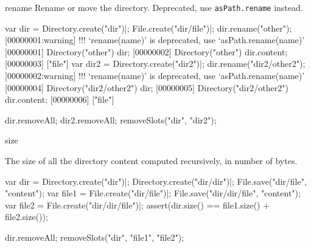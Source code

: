 \begin{urbiscriptapi}
\item[rename]
  Rename or move the directory. Deprecated, use
  \lstinline|asPath.rename| instead.
\begin{urbiscript}
var dir = Directory.create("dir")|;
File.create("dir/file")|;
dir.rename("other");
[00000001:warning] !!! `rename(name)' is deprecated, use `asPath.rename(name)'
[00000001] Directory("other")
dir;
[00000002] Directory("other")
dir.content;
[00000003] ["file"]
var dir2 = Directory.create("dir2")|;
dir.rename("dir2/other2");
[00000002:warning] !!! `rename(name)' is deprecated, use `asPath.rename(name)'
[00000004] Directory("dir2/other2")
dir;
[00000005] Directory("dir2/other2")
dir.content;
[00000006] ["file"]
\end{urbiscript}
\begin{urbicomment}
dir.removeAll;
dir2.removeAll;
removeSlots("dir", "dir2");
\end{urbicomment}


\item[size]
  \experimental{}

  The size of all the directory content computed recursively, in number of
  bytes.
\begin{urbiscript}
var dir = Directory.create("dir")|;
Directory.create("dir/dir")|;
File.save("dir/file", "content");
var file1 = File.create("dir/file")|;
File.save("dir/dir/file", "content");
var file2 = File.create("dir/dir/file")|;
assert(dir.size() == file1.size() + file2.size());
\end{urbiscript}
\begin{urbicomment}
dir.removeAll;
removeSlots("dir", "file1", "file2");
\end{urbicomment}
\end{urbiscriptapi}

